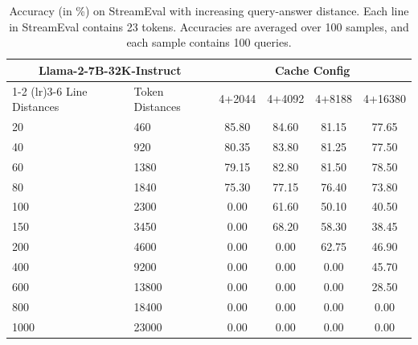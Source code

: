 \begin{table}
    \centering
    \caption{\small Accuracy (in \%) on StreamEval with increasing query-answer distance. Each line in StreamEval contains 23 tokens. Accuracies are averaged over 100 samples, and each sample contains 100 queries.}
    \label{tab:kv_lines}
    \begin{tabular}{llcccc}
        \toprule
        \multicolumn{2}{c}{Llama-2-7B-32K-Instruct} & \multicolumn{4}{c}{Cache Config}                                      \\
        \cmidrule(lr){1-2} \cmidrule(lr){3-6}
        Line Distances                              & Token Distances                  & 4+2044 & 4+4092 & 4+8188 & 4+16380 \\
        \midrule
        20                                          & 460                              & 85.80  & 84.60  & 81.15  & 77.65   \\
        40                                          & 920                              & 80.35  & 83.80  & 81.25  & 77.50   \\
        60                                          & 1380                             & 79.15  & 82.80  & 81.50  & 78.50   \\
        80                                          & 1840                             & 75.30  & 77.15  & 76.40  & 73.80   \\
        100                                         & 2300                             & 0.00   & 61.60  & 50.10  & 40.50   \\
        150                                         & 3450                             & 0.00   & 68.20  & 58.30  & 38.45   \\
        200                                         & 4600                             & 0.00   & 0.00   & 62.75  & 46.90   \\
        400                                         & 9200                             & 0.00   & 0.00   & 0.00   & 45.70   \\
        600                                         & 13800                            & 0.00   & 0.00   & 0.00   & 28.50   \\
        800                                         & 18400                            & 0.00   & 0.00   & 0.00   & 0.00    \\
        1000                                        & 23000                            & 0.00   & 0.00   & 0.00   & 0.00    \\
        \bottomrule
    \end{tabular}
\end{table}
